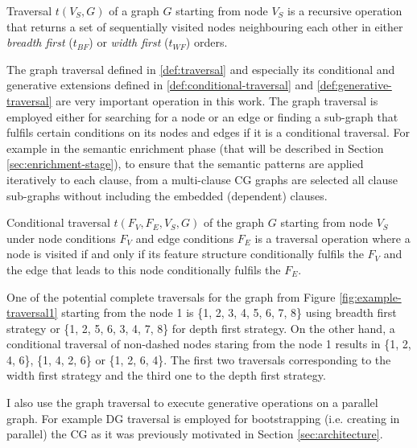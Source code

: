 \begin{definition}[Traversal]\label{def:traversal}
    Traversal $t(V_S,G)$ of a graph $G$ starting from node $V_S$ is a recursive operation that returns a set of sequentially visited nodes neighbouring each other in either \textit{breadth first} ($t_{BF}$) or \textit{width first} ($t_{WF}$) orders.
\end{definition}

The graph traversal defined in \ref{def:traversal} and especially its conditional and generative extensions defined in \ref{def:conditional-traversal} and \ref{def:generative-traversal} are very important operation in this work. 
The graph traversal is employed either for searching for a node or an edge or finding a sub-graph that fulfils certain conditions on its nodes and edges if it is a conditional traversal. For example in the semantic enrichment phase (that will be described in Section \ref{sec:enrichment-stage}), to ensure that the semantic patterns are applied iteratively to each clause, from a multi-clause CG graphs are selected all clause sub-graphs without including the embedded (dependent) clauses. 


\begin{definition}\label{def:conditional-traversal}
    Conditional traversal $t(F_V,F_E,V_S,G)$ of the graph $G$ starting from node $V_S$ under node conditions $F_V$ and edge conditions $F_E$ is a traversal operation where a node is visited if and only if its feature structure conditionally fulfils the $F_V$ and the edge that leads to this node conditionally fulfils the $F_E$.
\end{definition}

One of the potential complete traversals for the graph from Figure \ref{fig:example-traversal1} starting from the node 1 is \{1, 2, 3, 4, 5, 6, 7, 8\} using breadth first strategy or \{1, 2, 5, 6, 3, 4, 7, 8\} for depth first strategy. On the other hand, a conditional traversal of non-dashed nodes staring from the node 1 results in \{1, 2, 4, 6\}, \{1, 4, 2, 6\} or \{1, 2, 6, 4\}. The first two traversals corresponding to the width first strategy and the third one to the depth first strategy. 

I also use the graph traversal to execute generative operations on a parallel graph. For example DG traversal is employed for bootstrapping (i.e. creating in parallel) the CG as it was previously motivated in Section \ref{sec:architecture}.

